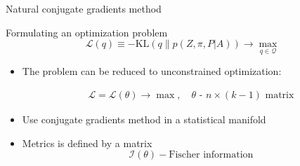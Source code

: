 \documentclass{beamer}
\theoremstyle{definition}
\theoremstyle{plain}
\theoremstyle{remark}
\begin{document}
			\begin{frame}{Natural conjugate gradients method} %
				\begin{block}{Formulating an optimization problem}
                    \begin{equation*}
                        \mathcal L(q) \equiv -\text{KL}\left(q \| p(Z, \pi, P | A)\right) \longrightarrow \max\limits_{q \in \mathcal Q}
                    \end{equation*}
				\end{block}
                \begin{itemize}
				    \item The problem can be reduced to unconstrained optimization:

                        \begin{equation}
                            \begin{aligned}
                            \nonumber
                            \mathcal L = \mathcal L(\theta) \longrightarrow \max, \quad \text{$\theta$ - $n\times(k-1)$ matrix}
                            \end{aligned}
                        \end{equation}

                    \item Use conjugate gradients method in a statistical manifold
                    \item Metrics is defined by a matrix
                        \[
                            \mathcal I(\theta) - \text{Fischer information}
                        \]
                \end{itemize}                
			\end{frame}
\end{document}
